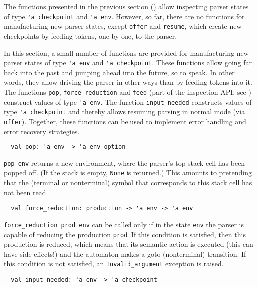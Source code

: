\documentclass[onecolumn,11pt,nocopyrightspace,preprint]{sigplanconf}
\begin{document}
The functions presented in the previous section
() allow inspecting parser states of type
\verb+'a checkpoint+ and \verb+'a env+. However, so far, there are no
functions for manufacturing new parser states, except \verb+offer+ and
\verb+resume+, which create new checkpoints by feeding tokens, one by one, to
the parser.

In this section, a small number of functions are provided for manufacturing
new parser states of type \verb+'a env+ and \verb+'a checkpoint+. These
functions allow going far back into the past and jumping ahead into the
future, so to speak. In other words, they allow driving the parser in other
ways than by feeding tokens into it. The functions \verb+pop+,
\verb+force_reduction+ and \verb+feed+ (part of the inspection API; see
) construct values of type \verb+'a env+. The function
\verb+input_needed+ constructs values of type \verb+'a checkpoint+ and thereby
allows resuming parsing in normal mode (via \verb+offer+). Together, these
functions can be used to implement error handling and error recovery
strategies.


\begin{verbatim}
  val pop: 'a env -> 'a env option
\end{verbatim}

\verb+pop env+ returns a new environment, where the parser's top stack cell
has been popped off. (If the stack is empty, \verb+None+ is returned.) This
amounts to pretending that the (terminal or nonterminal) symbol that
corresponds to this stack cell has not been read.


\begin{verbatim}
  val force_reduction: production -> 'a env -> 'a env
\end{verbatim}

\verb+force_reduction prod env+ can be called only if in the state \verb+env+
the parser is capable of reducing the production \verb+prod+. If this
condition is satisfied, then this production is reduced, which means that its
semantic action is executed (this can have side effects!) and the automaton
makes a goto (nonterminal) transition. If this condition is not satisfied, an
\verb+Invalid_argument+ exception is raised.


\begin{verbatim}
  val input_needed: 'a env -> 'a checkpoint
\end{verbatim}
\end{document}
